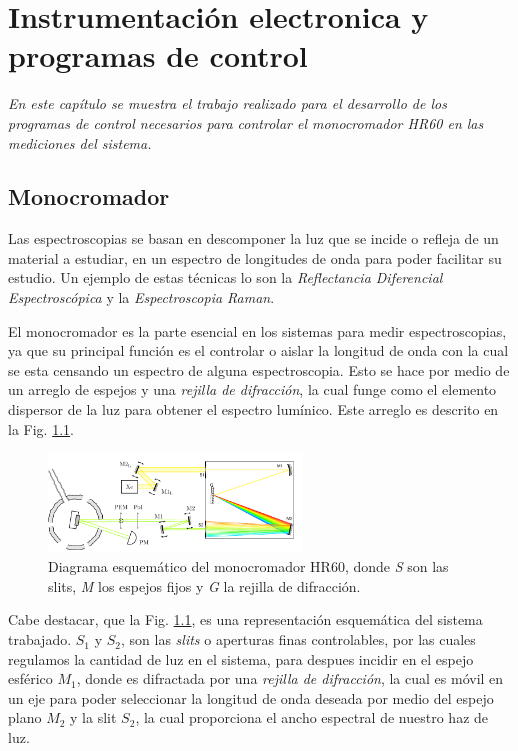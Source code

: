 \chapter{Instrumentación electronica y programas de control}
\label{chap:instrumentation}
\textit{En este capítulo se muestra el trabajo realizado para el desarrollo de los programas de control necesarios
para controlar el monocromador HR60 en las mediciones del sistema.}
\vfill
\minitoc
\newpage

\section{Monocromador}
\label{ch2:monochromator}
Las espectroscopias se basan en descomponer la luz que se incide o refleja de un material a estudiar, en un espectro de longitudes de onda para poder facilitar su estudio. Un ejemplo de estas técnicas lo son la \textit{Reflectancia Diferencial Espectroscópica} y la \textit{Espectroscopia Raman}.
 
El monocromador es la parte esencial en los sistemas para medir espectroscopias, ya que su principal función es el controlar o aislar la longitud de onda con la cual se esta censando un espectro de alguna espectroscopia\cite{Murty1974}. Esto se hace por medio de un arreglo de espejos y una \textit{rejilla de difracción}, la cual funge como el elemento dispersor de la luz para obtener el espectro lumínico. Este arreglo es descrito en la Fig. \ref{fig:mono_diagram}.

\begin{figure}[H]
    \centering
    \includegraphics[width=0.6\textwidth]{figures/chap2/mono1.pdf}
        \caption{Diagrama esquemático del monocromador HR60\cite{PdHGaby}, donde \textit{S} son las slits, \textit{M} los espejos fijos y \textit{G} la rejilla de difracción.}
    \label{fig:mono_diagram}
\end{figure}

Cabe destacar, que la Fig. \ref{fig:mono_diagram}, es una representación esquemática del sistema trabajado. $S_{1}$ y $S_{2}$, son las \textit{slits} o aperturas finas controlables, por las cuales regulamos la cantidad de luz en el sistema, para despues incidir en el espejo esférico $M_{1}$, donde es difractada por una \textit{rejilla de difracción}, la cual es móvil en un eje para poder seleccionar la longitud de onda deseada por medio del espejo plano $M_{2}$ y la slit $S_{2}$, la cual proporciona el ancho espectral de nuestro haz de luz.

